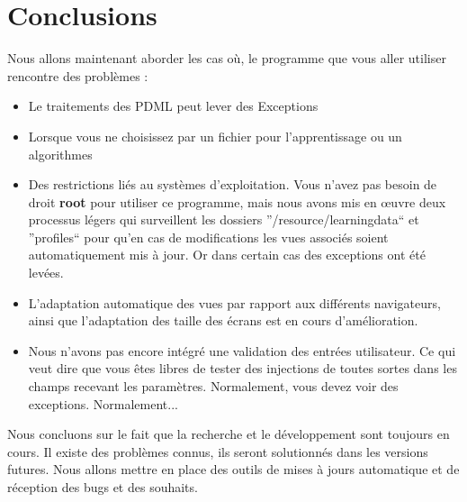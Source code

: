 \documentclass[a4paper,10pt,justified,openany]{tufte-book}
\begin{document}
\chapter{Conclusions}
Nous allons maintenant aborder les cas où, le programme que vous aller utiliser rencontre des problèmes :  
\begin{itemize}
\item Le traitements des PDML peut lever des Exceptions 

\item Lorsque vous ne choisissez par un fichier pour l'apprentissage ou un algorithmes

\item Des restrictions liés au systèmes d'exploitation. Vous n'avez pas besoin de droit \textbf{root} pour utiliser ce programme, mais nous avons mis en œuvre deux processus légers qui surveillent
les dossiers ''/resource/learningdata`` et ''profiles`` pour qu'en cas de modifications les vues associés soient automatiquement mis à jour. Or dans certain cas des exceptions ont été levées. 

\item L'adaptation automatique des vues par rapport aux différents navigateurs, ainsi que l'adaptation des taille des écrans est en cours d'amélioration. 

\item Nous n'avons pas encore intégré une validation des entrées utilisateur. Ce qui veut dire que vous êtes libres de tester des injections de toutes sortes dans les champs recevant les paramètres. Normalement, vous devez voir des exceptions. Normalement...

\end{itemize}

Nous concluons sur le fait que la recherche et le développement sont toujours en cours. Il existe des problèmes connus, ils seront solutionnés dans les versions futures.
Nous allons mettre en place des outils de mises à jours automatique et de réception des bugs et des souhaits. 
\end{document}
